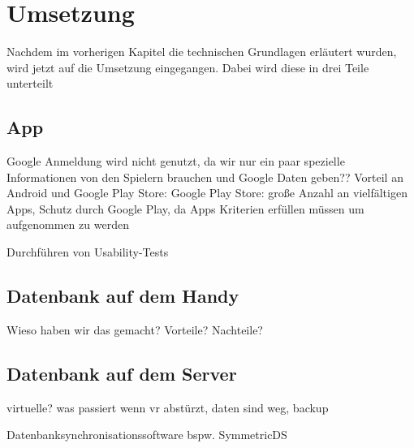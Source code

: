\chapter{Umsetzung}

Nachdem im vorherigen Kapitel die technischen Grundlagen erläutert wurden, wird jetzt auf die Umsetzung eingegangen. Dabei wird diese in drei Teile unterteilt

\section{App}
Google Anmeldung wird nicht genutzt, da wir nur ein paar spezielle Informationen von den Spielern brauchen und Google Daten geben??
Vorteil an Android und Google Play Store: Google Play Store: große Anzahl an vielfältigen Apps, Schutz durch Google Play, da Apps Kriterien erfüllen müssen um aufgenommen zu werden

		Durchführen von Usability-Tests

\section{Datenbank auf dem Handy}
Wieso haben wir das gemacht? Vorteile? Nachteile?
	
\section{Datenbank auf dem Server}
virtuelle? was passiert wenn vr abstürzt, daten sind weg, backup

Datenbanksynchronisationssoftware bspw. SymmetricDS